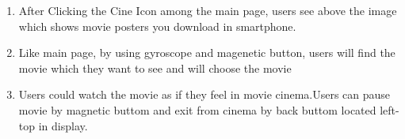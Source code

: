\documentclass[12pt]{article}
\begin{document}
\begin{enumerate}
\item After Clicking the Cine Icon among the main page, users see above the image which shows movie posters you download in smartphone.   
\item Like main page, by using gyroscope and magenetic button, users will find the movie which they want to see and will choose the movie
\item Users could watch the movie as if they feel in movie cinema.Users can pause movie by magnetic buttom and exit from cinema by back buttom located left-top in display.
\end{enumerate}
\end{document}
